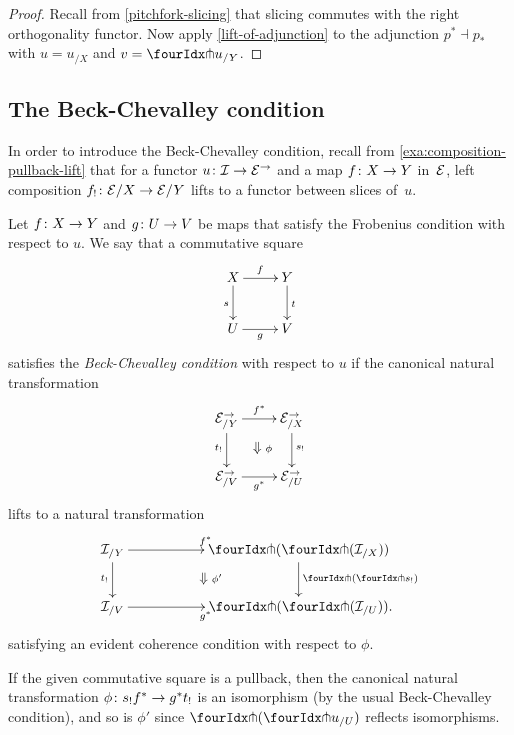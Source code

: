 \documentclass[reqno,10pt,a4paper,oneside,draft]{amsart}
\begin{document}
\begin{proof}
Recall from \cref{pitchfork-slicing} that slicing commutes with the right orthogonality functor.
Now apply \cref{lift-of-adjunction} to the adjunction $p^* \dashv p_*$ with $u = u_{/X}$ and $v = {\liftr{u}}_{/Y}$.
\end{proof}

\subsection*{The Beck-Chevalley condition}

In order to introduce the Beck-Chevalley condition, recall from \cref{exa:composition-pullback-lift} that for a functor $u \colon \mathcal{I} \to \mathcal{E}^\to$ and a map $f \colon X \to Y$ in~$\mathcal{E}$, left composition $f_! \colon \mathcal{E}/X \to \mathcal{E}/Y$ lifts to a functor between slices of~$u$.

\begin{definition} \label{def:beck-chevalley}
Let $f \colon X \to Y$ and $g \colon U \to V$ be maps that satisfy the Frobenius condition with respect to $u$.
We say that a commutative square
\[
\xymatrix{
  X
  \ar[r]^{f}
  \ar[d]_{s}
&
  Y
  \ar[d]^{t}
\\
  U
  \ar[r]_{g}
&
  V
}
\]
satisfies the \emph{Beck-Chevalley condition} with respect to $u$ if the canonical natural transformation
\[
\xymatrix{
  \catE^\to_{/Y}
  \ar[d]_{t_!}
  \ar[r]^{f^*}
  \ar@{}[dr]|{\textstyle\Downarrow \rlap{$\labelstyle\phi$}}
&
  \catE^\to_{/X}
  \ar[d]^{s_!}
\\
  \catE^\to_{/V}
  \ar[r]_{g^*}
&
  \catE^\to_{/U}
}
\]
lifts to a natural transformation
\[
\xymatrix@C+3em{
  \cal{I}_{/Y}
  \ar[r]^{f^*}
  \ar[d]_{t_!}
  \ar@{}[dr]|{\textstyle\Downarrow \rlap{$\labelstyle\phi'$}}
&
  {\liftl{(\liftr{(\cal{I}_{/X})})}}
  \ar[d]^{\liftl{(\liftr{s_!})}}
\\
  \cal{I}_{/V}
  \ar[r]_{g^*}
&
  {\liftl{(\liftr{(\cal{I}_{/U})})}}
\rlap{.}}
\]
satisfying an evident coherence condition with respect to $\phi$.
\end{definition}

\begin{remark} \label{beck-chevalley-iso}
If the given commutative square is a pullback, then the canonical natural transformation $\phi \colon s_! f^* \to g^* t_!$ is an isomorphism (by the usual Beck-Chevalley condition), and so is $\phi'$ since $\liftl{(\liftr{u_{/U}})}$ reflects isomorphisms.
\end{remark}
\end{document}
